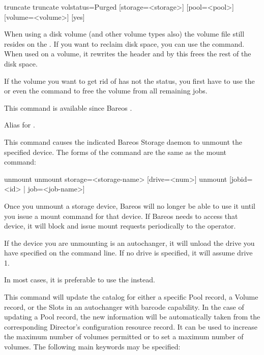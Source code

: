 \begin{description}
\begin{bconsole}{truncate}
truncate volstatus=Purged [storage=<storage>] [pool=<pool>] [volume=<volume>] [yes]
\end{bconsole}

    When using a disk volume (and other volume types also) the volume file still resides on the \bareosSd.
    If you want to reclaim disk space, you can use the  command.
    When used on a volume, it rewrites the header and by this frees the rest of the disk space.

    If the volume you want to get rid of has not the  status,
    you first have to use the  or even the  command
    to free the volume from all remaining jobs.

    This command is available since Bareos .

\item [umount]
   Alias for .

\item [unmount]
   This command causes the indicated Bareos Storage  daemon to unmount the
   specified device. The forms of the command  are the same as the mount command:

\begin{bconsole}{unmount}
unmount storage=<storage-name> [drive=<num>]
unmount [jobid=<id> | job=<job-name>]
\end{bconsole}

   Once you unmount a storage device, Bareos will no longer be able to use
   it until you issue a mount command for that device. If Bareos needs to
   access that device, it will block and issue mount requests periodically
   to the operator.

   If the device you are unmounting is an autochanger, it will unload
   the drive you have specified on the command line. If no drive is
   specified, it will assume drive 1.

   In most cases, it is preferable to use the  instead.

\item [update]
   \label{UpdateCommand}
   This command will update the catalog for either a specific Pool record, a Volume
   record, or the Slots in an  autochanger with barcode capability. In the case
   of updating a  Pool record, the new information will be automatically taken
   from  the corresponding Director's configuration resource record. It  can be
   used to increase the maximum number of volumes permitted or  to set a maximum
   number of volumes. The following main keywords may be specified:


\end{description}
